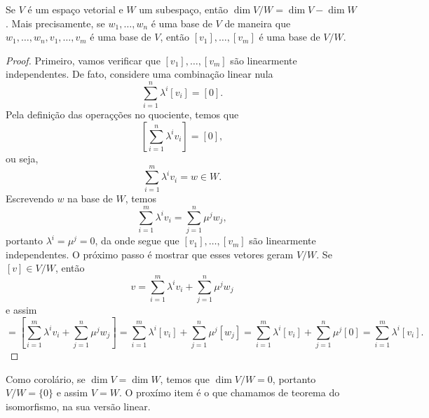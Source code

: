\begin{proposition}
    Se $V$ é um espaço vetorial e $W$ um subespaço, então $\dim V/W = \dim V - \dim W$. Mais precisamente, se $w_1, \dots, w_n$ é uma base de $V$ de maneira que $w_1, \dots, w_n, v_1, \dots, v_m$ é uma base de $V$, então $[v_1], \dots, [v_m]$ é uma base de $V/W$.
\end{proposition}
\begin{proof}
    Primeiro, vamos verificar que $[v_1], \dots, [v_m]$ são linearmente independentes. De fato, considere uma combinação linear nula \begin{equation}
        \sum_{i = 1}^n \lambda^i [v_i] = [0].
    \end{equation} Pela definição das operaçções no quociente, temos que \begin{equation}
        \left[\sum_{i = 1}^n \lambda^i v_i\right] = [0],
    \end{equation} ou seja, \begin{equation}
        \sum_{i = 1}^m \lambda^i v_i = w \in W.
    \end{equation} Escrevendo $w$ na base de $W$, temos \begin{equation}
        \sum_{i = 1}^m \lambda^i v_i = \sum_{j = 1}^n \mu^j w_j,
    \end{equation} portanto $\lambda^i = \mu^j = 0$, da onde segue que $[v_1], \dots, [v_m]$ são linearmente independentes. O próximo passo é mostrar que esses vetores geram $V/W$. Se $[v] \in V/W$, então \begin{equation}
        v = \sum_{i = 1}^m \lambda^i v_i + \sum_{j = 1}^n \mu^j w_j
    \end{equation} e assim \begin{equation}
        [v] = \left[\sum_{i = 1}^m \lambda^i v_i + \sum_{j = 1}^n \mu^j w_j\right] = \sum_{i = 1}^m \lambda^i [v_i] + \sum_{j = 1}^n \mu^j [w_j] = \sum_{i = 1}^m \lambda^i [v_i] + \sum_{j = 1}^n \mu^j [0] = \sum_{i = 1}^m \lambda^i [v_i].
    \end{equation}
\end{proof}

Como corolário, se $\dim V = \dim W$, temos que $\dim V/W = 0$, portanto $V/W = \{0\}$ e assim $V = W$. O proxímo item é o que chamamos de teorema do isomorfismo, na sua versão linear.

